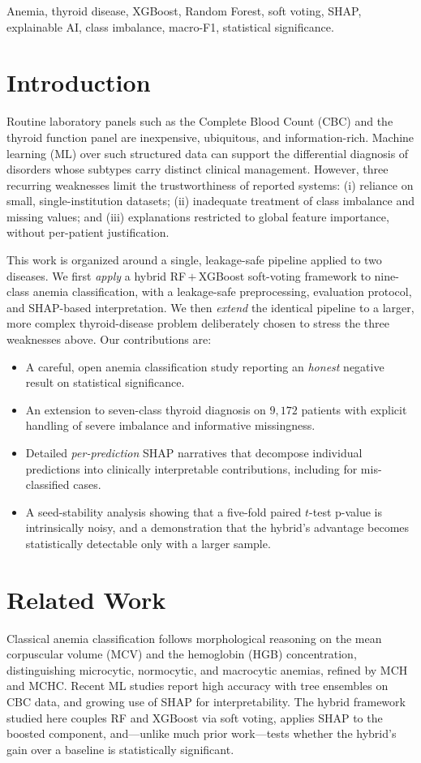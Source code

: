 \documentclass[conference]{IEEEtran}
\begin{document}
\begin{IEEEkeywords}
Anemia, thyroid disease, XGBoost, Random Forest, soft voting, SHAP, explainable
AI, class imbalance, macro-F1, statistical significance.
\end{IEEEkeywords}

\section{Introduction}
Routine laboratory panels such as the Complete Blood Count (CBC) and the thyroid
function panel are inexpensive, ubiquitous, and information-rich. Machine learning
(ML) over such structured data can support the differential diagnosis of disorders
whose subtypes carry distinct clinical management. However, three recurring
weaknesses limit the trustworthiness of reported systems: (i) reliance on small,
single-institution datasets; (ii) inadequate treatment of class imbalance and
missing values; and (iii) explanations restricted to global feature importance,
without per-patient justification.

This work is organized around a single, leakage-safe pipeline applied to two
diseases. We first \emph{apply} a hybrid RF\,$+$\,XGBoost soft-voting framework
to nine-class anemia classification, with a leakage-safe preprocessing,
evaluation protocol, and SHAP-based interpretation. We then \emph{extend} the
identical pipeline to a larger, more complex thyroid-disease problem deliberately
chosen to stress the three weaknesses above. Our contributions are:
\begin{itemize}
\item A careful, open anemia classification study reporting an \emph{honest}
negative result on statistical significance.
\item An extension to seven-class thyroid diagnosis on $9{,}172$ patients with
explicit handling of severe imbalance and informative missingness.
\item Detailed \emph{per-prediction} SHAP narratives that decompose individual
predictions into clinically interpretable contributions, including for
mis-classified cases.
\item A seed-stability analysis showing that a five-fold paired $t$-test p-value
is intrinsically noisy, and a demonstration that the hybrid's advantage becomes
statistically detectable only with a larger sample.
\end{itemize}

\section{Related Work}
Classical anemia classification follows morphological reasoning on the mean
corpuscular volume (MCV) and the hemoglobin (HGB) concentration, distinguishing
microcytic, normocytic, and macrocytic anemias, refined by MCH and MCHC. Recent
ML studies report high accuracy with tree ensembles on CBC data, and growing use
of SHAP for interpretability. The hybrid framework studied here couples RF
and XGBoost via soft voting, applies SHAP to the boosted component, and---unlike
much prior work---tests whether the hybrid's gain over a baseline is statistically
significant.
\end{document}

